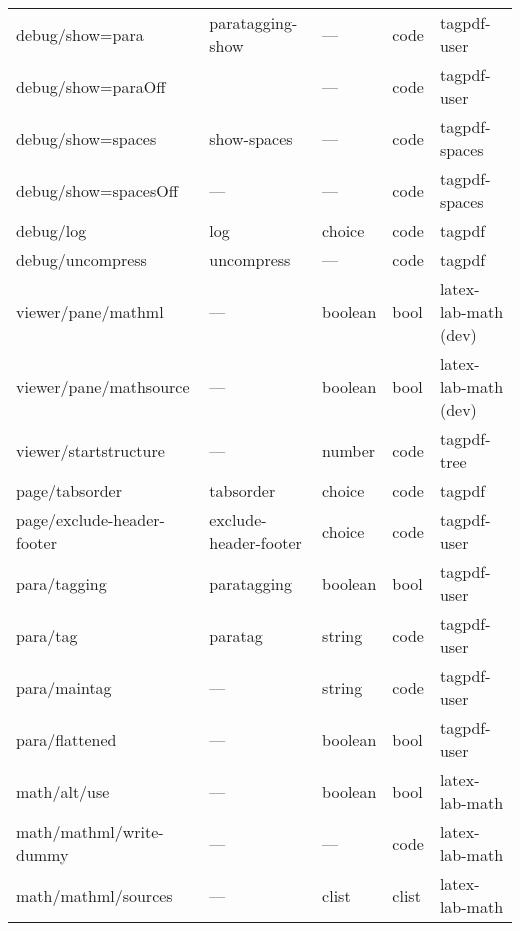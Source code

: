 \begin{tabular}{lllll}
debug/show=para  & paratagging-show&    ---           &code  & tagpdf-user\\
debug/show=paraOff&                &    ---           &code  & tagpdf-user\\
debug/show=spaces & show-spaces    &    ---           &code  & tagpdf-spaces\\
debug/show=spacesOff& ---          &    ---           &code  & tagpdf-spaces\\
debug/log        & log             & choice           &code  & tagpdf \\
debug/uncompress & uncompress      &  ---             &code  & tagpdf\\[4pt]\midrule  
viewer/pane/mathml &  ---          &  boolean         &bool  &latex-lab-math (dev)\\
viewer/pane/mathsource& ---        &boolean           &bool  &latex-lab-math (dev)\\
viewer/startstructure & ---        &number            &code  &tagpdf-tree \\[4pt]\midrule
page/tabsorder  &tabsorder         & choice          & code & tagpdf\\   
page/exclude-header-footer & exclude-header-footer &choice & code &tagpdf-user\\[4pt]\midrule
para/tagging     &paratagging      &boolean          &bool  &tagpdf-user\\
para/tag         &paratag          &string           &code  &tagpdf-user\\
para/maintag     &---              &string           &code  &tagpdf-user\\
para/flattened   &---              &boolean          &bool  &tagpdf-user\\[4pt]\midrule
math/alt/use     &---              &boolean          &bool  &latex-lab-math\\
math/mathml/write-dummy & ---      &---              &code  &latex-lab-math\\
math/mathml/sources &---           & clist           &clist &latex-lab-math\\

\end{tabular}
